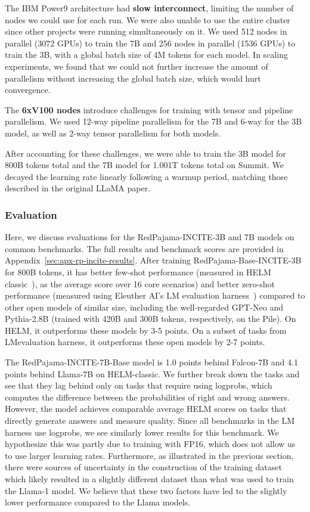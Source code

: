\documentclass{article}
\begin{document}
The IBM Power9 architecture had \textbf{slow interconnect}, limiting the number of nodes we could use for each run.
We were also unable to use the entire cluster since other projects were running simultaneously on it.
We used 512 nodes in parallel (3072 GPUs) to train the 7B and 256 nodes in parallel (1536 GPUs) to train the 3B, with a global batch size of 4M tokens for each model.
In scaling experiments, we found that we could not further increase the amount of parallelism without increasing the global batch size, which would hurt convergence.

The \textbf{6xV100 nodes} introduce challenges for training with tensor and pipeline parallelism.
We used 12-way pipeline parallelism for the 7B and 6-way for the 3B model, as well as 2-way tensor parallelism for both models.

After accounting for these challenges, we were able to train the 3B model for 800B tokens total and the 7B model for 1.001T tokens total on Summit.
We decayed the learning rate linearly following a warmup period, matching those described in the original LLaMA paper.

\subsubsection{Evaluation}
\label{sec:rpv1_incite_eval}
Here, we discuss evaluations for the RedPajama-INCITE-3B and 7B models on common benchmarks. The full results and benchmark scores are provided in Appendix~\ref{sec:apx-rp-incite-results}.
After training RedPajama-Base-INCITE-3B for 800B tokens, it has better few-shot performance (measured in HELM classic~\cite{bommasani2023holistic}), as the average score over 16 core scenarios) and better zero-shot performance (measured using Eleuther AI’s LM evaluation harness~\cite{eval-harness}) compared to other open models of similar size, including the well-regarded GPT-Neo and Pythia-2.8B (trained with 420B and 300B tokens, respectively, on the Pile). On HELM, it outperforms these models by 3-5 points. On a subset of tasks from LMevaluation harness, it outperforms these open models by 2-7 points.

The RedPajama-INCITE-7B-Base model is 1.0 points behind Falcon-7B and 4.1 points behind Llama-7B on HELM-classic. We further break down the tasks and see that they lag behind only on tasks that require using logprobs, which computes the difference between the probabilities of right and wrong answers. However, the model achieves comparable average HELM scores on tasks that directly generate answers and measure quality. Since all benchmarks in the LM harness use logprobs, we see similarly lower results for this benchmark. We hypothesize this was partly due to training with FP16, which does not allow us to use larger learning rates. Furthermore, as illustrated in the previous section, there were sources of uncertainty in the construction of the training dataset which likely resulted in a slightly different dataset than what was used to train the Llama-1 model. We believe that these two factors have led to the slightly lower performance compared to the Llama models.
\end{document}
